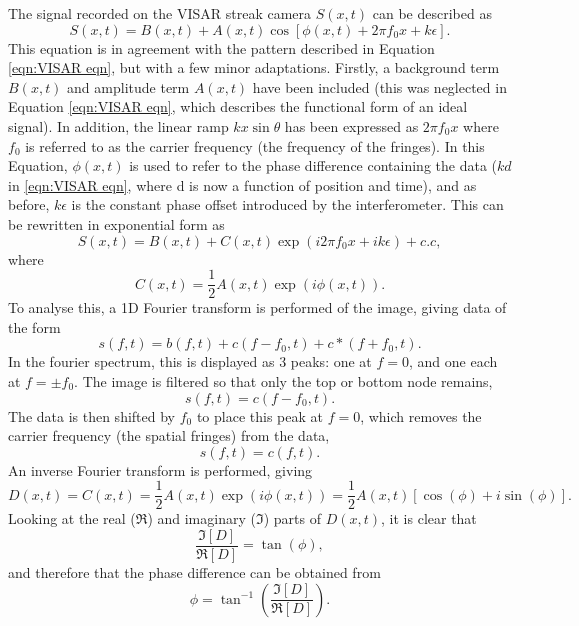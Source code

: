 The signal recorded on the VISAR streak camera $S(x,t)$ can be described as 
\begin{equation} S(x,t) = B(x,t) + A(x,t) \cos[ \phi (x,t) + 2\pi f_0 x + k\epsilon ]. \end{equation}
This equation is in agreement with the pattern described in Equation \ref{eqn:VISAR eqn}, but with a few minor adaptations. Firstly, a background term $B(x,t)$ and amplitude term $A(x,t)$ have been included (this was neglected in Equation \ref{eqn:VISAR eqn}, which describes the functional form of an ideal signal). In addition, the linear ramp $kx\sin\theta$ has been expressed as $2\pi f_0 x$ where $f_0$ is referred to as the carrier frequency (the frequency of the fringes). In this Equation, $\phi(x,t)$ is used to refer to the phase difference containing the data ($kd$ in \ref{eqn:VISAR eqn}, where d is now a function of position and time), and as before, $k\epsilon$ is the constant phase offset introduced by the interferometer. This can be rewritten in exponential form as 
\begin{equation} S(x,t) = B(x,t) + C(x,t) \exp(i2\pi f_0 x + ik\epsilon) + c.c, \end{equation} where 
\begin{equation} C(x,t) = \frac{1}{2} A(x,t) \exp(i\phi(x,t)). \end{equation}
To analyse this, a 1D Fourier transform is performed of the image, giving data of the form
\begin{equation} s(f,t) = b(f,t) + c(f - f_0,t) + c*(f + f_0,t). \end{equation}
In the fourier spectrum, this is displayed as 3 peaks: one at $f=0$, and one each at $f = \pm f_0$. The image is filtered so that only the top or bottom node remains,
\begin{equation} s(f,t) = c(f - f_0,t). \end{equation}
The data is then shifted by $f_0$ to place this peak at $f=0$, which removes the carrier frequency (the spatial fringes) from the data,
\begin{equation} s(f,t) = c(f,t). \end{equation}
An inverse Fourier transform is performed, giving 
\begin{equation} D(x,t) = C(x,t) = \frac{1}{2}A(x,t)\exp(i\phi(x,t)) = \frac{1}{2}A(x,t)[\cos(\phi) + i\sin(\phi)]. \end{equation}
Looking at the real ($\Re$) and imaginary ($\Im$) parts of $D(x,t)$, it is clear that 
\begin{equation} \frac{\Im[D]}{\Re[D]} = \tan(\phi), \end{equation}
and therefore that the phase difference can be obtained from 
\begin{equation} \phi = \tan^{-1}(\frac{\Im[D]}{\Re[D]}). \end{equation}

